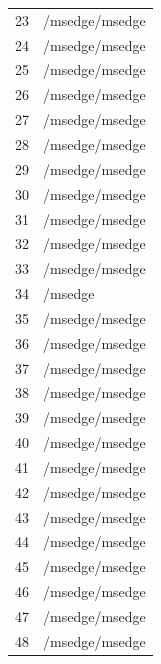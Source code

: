 \documentclass[a4paper,twoside,12pt]{book}
\begin{document}
\begin{appendices}
\begin{table}
\begin{tabular}{ll}
		23  &                                     /msedge/msedge \\
		24  &                                     /msedge/msedge \\
		25  &                                     /msedge/msedge \\
		26  &                                     /msedge/msedge \\
		27  &                                     /msedge/msedge \\
		28  &                                     /msedge/msedge \\
		29  &                                     /msedge/msedge \\
		30  &                                     /msedge/msedge \\
		31  &                                     /msedge/msedge \\
		32  &                                     /msedge/msedge \\
		33  &                                     /msedge/msedge \\
		34  &                                            /msedge \\
		35  &                                     /msedge/msedge \\
		36  &                                     /msedge/msedge \\
		37  &                                     /msedge/msedge \\
		38  &                                     /msedge/msedge \\
		39  &                                     /msedge/msedge \\
		40  &                                     /msedge/msedge \\
		41  &                                     /msedge/msedge \\
		42  &                                     /msedge/msedge \\
		43  &                                     /msedge/msedge \\
		44  &                                     /msedge/msedge \\
		45  &                                     /msedge/msedge \\
		46  &                                     /msedge/msedge \\
		47  &                                     /msedge/msedge \\
		48  &                                     /msedge/msedge \\

\end{tabular}
\end{table}
\end{appendices}
\end{document}
